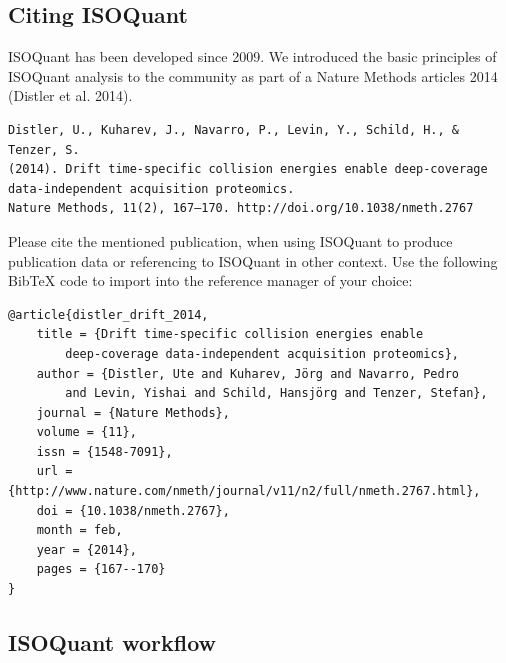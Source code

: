 \documentclass[]{article}
\begin{document}
\subsection{Citing ISOQuant}\label{citing-isoquant}

ISOQuant has been developed since 2009. We introduced the basic
principles of ISOQuant analysis to the community as part of a Nature
Methods articles 2014 (Distler et al. 2014).

\begin{lstlisting}
Distler, U., Kuharev, J., Navarro, P., Levin, Y., Schild, H., & Tenzer, S.
(2014). Drift time-specific collision energies enable deep-coverage
data-independent acquisition proteomics. 
Nature Methods, 11(2), 167–170. http://doi.org/10.1038/nmeth.2767
\end{lstlisting}

Please cite the mentioned publication, when using ISOQuant to produce
publication data or referencing to ISOQuant in other context. Use the
following BibTeX code to import into the reference manager of your
choice:

\begin{lstlisting}
@article{distler_drift_2014,
    title = {Drift time-specific collision energies enable 
        deep-coverage data-independent acquisition proteomics},
    author = {Distler, Ute and Kuharev, Jörg and Navarro, Pedro
        and Levin, Yishai and Schild, Hansjörg and Tenzer, Stefan},
    journal = {Nature Methods},
    volume = {11},
    issn = {1548-7091},
    url = {http://www.nature.com/nmeth/journal/v11/n2/full/nmeth.2767.html},
    doi = {10.1038/nmeth.2767},
    month = feb,
    year = {2014},
    pages = {167--170}
}
\end{lstlisting}

\clearpage

\subsection{ISOQuant workflow}\label{isoquant-workflow}
\end{document}

